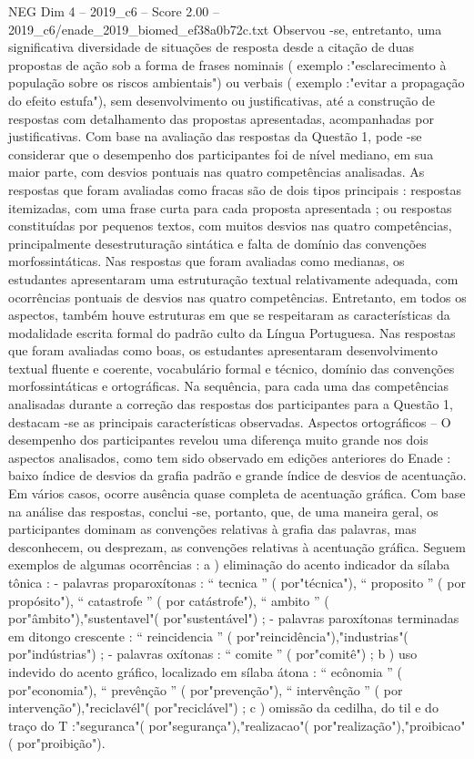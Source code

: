 \begin{textsample}{NEG Dim 4 – 2019\_c6 – Score 2.00 – 2019\_c6/enade\_2019\_biomed\_ef38a0b72c.txt}
Observou -se, entretanto, uma significativa diversidade de situações de resposta desde a citação de duas propostas de ação sob a forma de frases nominais ( exemplo :"esclarecimento à população sobre os riscos ambientais") ou verbais ( exemplo :"evitar a propagação do efeito estufa"), sem desenvolvimento ou justificativas, até a construção de respostas com detalhamento das propostas apresentadas, acompanhadas por justificativas.
Com base na avaliação das respostas da Questão 1, pode -se considerar que o desempenho dos participantes foi de nível mediano, em sua maior parte, com desvios pontuais nas quatro competências analisadas.
As respostas que foram avaliadas como fracas são de dois tipos principais : respostas itemizadas, com uma frase curta para cada proposta apresentada ; ou respostas constituídas por pequenos textos, com muitos desvios nas quatro competências, principalmente desestruturação sintática e falta de domínio das convenções morfossintáticas.
Nas respostas que foram avaliadas como medianas, os estudantes apresentaram uma estruturação textual relativamente adequada, com ocorrências pontuais de desvios nas quatro competências.
Entretanto, em todos os aspectos, também houve estruturas em que se respeitaram as características da modalidade escrita formal do padrão culto da Língua Portuguesa.
Nas respostas que foram avaliadas como boas, os estudantes apresentaram desenvolvimento textual fluente e coerente, vocabulário formal e técnico, domínio das convenções morfossintáticas e ortográficas.
Na sequência, para cada uma das competências analisadas durante a correção das respostas dos participantes para a Questão 1, destacam -se as principais características observadas.
Aspectos ortográficos – O desempenho dos participantes revelou uma diferença muito grande nos dois aspectos analisados, como tem sido observado em edições anteriores do Enade : baixo índice de desvios da grafia padrão e grande índice de desvios de acentuação.
Em vários casos, ocorre ausência quase completa de acentuação gráfica.
Com base na análise das respostas, conclui -se, portanto, que, de uma maneira geral, os participantes dominam as convenções relativas à grafia das palavras, mas desconhecem, ou desprezam, as convenções relativas à acentuação gráfica.
Seguem exemplos de algumas ocorrências : a ) eliminação do acento indicador da sílaba tônica : - palavras proparoxítonas : “ tecnica ” ( por"técnica"), “ proposito ” ( por propósito"), “ catastrofe ” ( por catástrofe"), “ ambito ” ( por"âmbito"),"sustentavel"( por"sustentável") ; - palavras paroxítonas terminadas em ditongo crescente : “ reincidencia ” ( por"reincidência"),"industrias"( por"indústrias") ; - palavras oxítonas : “ comite ” ( por"comitê") ; b ) uso indevido do acento gráfico, localizado em sílaba átona : “ ecônomia ” ( por"economia"), “ prevênção ” ( por"prevenção"), “ intervênção ” ( por intervenção"),"reciclavél"( por"reciclável") ; c ) omissão da cedilha, do til e do traço do T :"seguranca"( por"segurança"),"realizacao"( por"realização"),"proibicao"( por"proibição").

\end{textsample}
